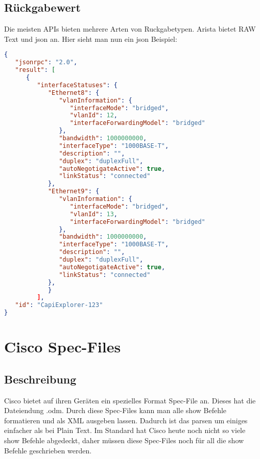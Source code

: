 \documentclass[a4,12pt]{scrartcl}
\begin{document}
\subsection{Rückgabewert}
Die meisten APIs bieten mehrere Arten von Ruckgabetypen. Arista bietet RAW Text und json an. Hier sieht man nun ein json Beispiel:\newline
\begin{lstlisting}[language=json,firstnumber=1]
{
   "jsonrpc": "2.0",
   "result": [
      {
         "interfaceStatuses": {
            "Ethernet8": {
               "vlanInformation": {
                  "interfaceMode": "bridged",
                  "vlanId": 12,
                  "interfaceForwardingModel": "bridged"
               },
               "bandwidth": 1000000000,
               "interfaceType": "1000BASE-T",
               "description": "",
               "duplex": "duplexFull",
               "autoNegotigateActive": true,
               "linkStatus": "connected"
            },
            "Ethernet9": {
               "vlanInformation": {
                  "interfaceMode": "bridged",
                  "vlanId": 13,
                  "interfaceForwardingModel": "bridged"
               },
               "bandwidth": 1000000000,
               "interfaceType": "1000BASE-T",
               "description": "",
               "duplex": "duplexFull",
               "autoNegotigateActive": true,
               "linkStatus": "connected"
            },
            }
         ],
   "id": "CapiExplorer-123"
}
\end{lstlisting}
\newpage
\section{Cisco Spec-Files}
\subsection{Beschreibung}
Cisco bietet auf ihren Geräten ein spezielles Format Spec-File an. Dieses hat die Dateiendung .odm. Durch diese Spec-Files kann man alle show Befehle formatieren und als XML ausgeben lassen. Dadurch ist das parsen um einiges einfacher als bei Plain Text. Im Standard hat Cisco heute noch nicht so viele show Befehle abgedeckt, daher müssen diese Spec-Files noch für all die show Befehle geschrieben werden.
\end{document}
